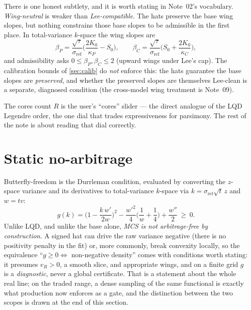 \documentclass[11pt]{article}
\newcommand{\vref}{\sigma_{\mathrm{ref}}}
\newcommand{\betP}{\beta_P}
\newcommand{\betC}{\beta_C}
\begin{document}
There is one honest subtlety, and it is worth stating in Note~02's vocabulary.
\emph{Wing-neutral} is weaker than \emph{Lee-compatible}.  The hats preserve the
base wing slopes, but nothing constrains those base slopes to be admissible in
the first place.  In total-variance $k$-space the wing slopes are
\begin{equation}
\betP=\frac{\sqrt{\tau}}{\vref}\Big(\frac{2K_0}{\kappa_P}-S_0\Big),\qquad
\betC=\frac{\sqrt{\tau}}{\vref}\Big(S_0+\frac{2K_0}{\kappa_C}\Big),
\label{eq:betak}
\end{equation}
and admissibility asks $0\le\betP,\betC\le2$ (upward wings under Lee's cap).
The calibration bounds of \cref{sec:calib} do \emph{not} enforce this: the hats
guarantee the base slopes are \emph{preserved}, and whether the preserved slopes
are themselves Lee-clean is a separate, diagnosed condition (the cross-model
wing treatment is Note~09).

The cores count $R$ is the user's ``cores'' slider --- the direct analogue of
the LQD Legendre order, the one dial that trades expressiveness for parsimony.
The rest of the note is about reading that dial correctly.

\section{Static no-arbitrage}
\label{sec:noarb}

Butterfly-freedom is the Durrleman condition, evaluated by converting the
$z$-space variance and its derivatives to total-variance $k$-space via
$k=\vref\sqrt t\,z$ and $w=tv$:
\begin{equation}
g(k)=\Big(1-\frac{k\,w'}{2w}\Big)^2-\frac{w'^2}{4}\Big(\frac1w+\frac14\Big)+\frac{w''}{2}\ \ge\ 0.
\label{eq:g}
\end{equation}
Unlike LQD, and unlike the base alone, \emph{MCS is not arbitrage-free by
construction}.  A signed hat can drive the raw variance negative (there is no
positivity penalty in the fit) or, more commonly, break convexity locally, so
the equivalence ``$g\ge0\iff$ non-negative density'' comes with conditions worth
stating: it presumes $v_R>0$, a smooth slice, and appropriate wings, and on a
finite grid $g$ is a \emph{diagnostic}, never a global certificate.  That is
a statement about the whole real line; on the traded range, a dense sampling
of the same functional is exactly what production now enforces as a gate,
and the distinction between the two scopes is drawn at the end of this
section.
\end{document}

